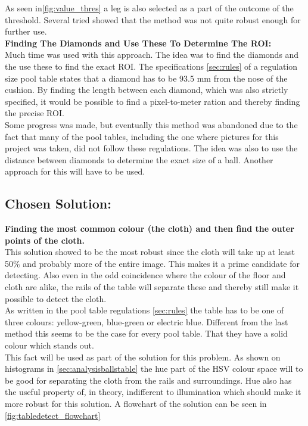 As seen in\ref{fig:value_thres} a leg is also selected as a part of the outcome of the threshold. Several tried showed that the method was not quite robust enough for further use.\\

\textbf{Finding The Diamonds and Use These To Determine The ROI:}\\
Much time was used with this approach. The idea was to find the diamonds and the use these to find the exact ROI. The specifications \ref{sec:rules} of a regulation size pool table states that a diamond has to be 93.5 mm from the nose of the cushion. By finding the length between each diamond, which was also strictly specified, it would be possible to find a pixel-to-meter ration and thereby finding the precise ROI.\\

Some progress was made, but eventually this method was abandoned due to the fact that many of the pool tables, including the one where pictures for this  project was taken, did not follow these regulations. The idea was also to use the distance between diamonds to determine the exact size of a ball. Another approach for this will have to be used.\\

\subsection{Chosen Solution:}

\textbf{Finding the most common colour (the cloth) and then find the outer points of the cloth.}\\
This solution showed to be the most robust since the cloth will take up at least 50\% and probably more of the entire image. This makes it a prime candidate for detecting. Also even in the odd coincidence where the colour of the floor and cloth are alike, the rails of the table will separate these and thereby still make it possible to detect the cloth.\\

As written in the pool table regulations \ref{sec:rules} the table has to be one of three colours: yellow-green, blue-green or electric blue. Different from the last method this seems to be the case for every pool table. That they have a solid colour which stands out.\\

This fact will be used as part of the solution for this problem. As shown on histograms in \ref{sec:analysisballstable} the hue part of the HSV colour space will to be good for separating the cloth from the rails and surroundings. Hue also has the useful property of, in theory, indifferent to illumination which should make it more robust for this solution. A flowchart of the solution can be seen in \ref{fig:tabledetect_flowchart}

